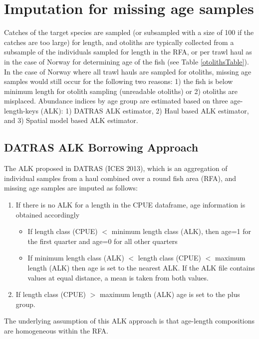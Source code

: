 \documentclass[a4paper 12pt]{article}
\numberwithin{equation}{section}
\begin{document}
{%
\section{\large Imputation for missing age samples}
\label{sec:imputationappendix}
Catches of the target species are sampled (or subsampled with a size of 100 if the catches are too large) for length, and otoliths are typically collected from a subsample of the individuals sampled for length in the RFA,  or per trawl haul as in the case of Norway for determining age of the fish (see Table \ref{otolithsTable}). In the case of Norway where all trawl hauls are sampled for otoliths, missing age samples would still occur for the following two reasons: 1) the fish is below minimum length for otolith sampling (unreadable otoliths) or 2) otoliths are misplaced. Abundance indices by age group are estimated based on three age-length-keys (ALK): 1) DATRAS ALK estimator, 2) Haul based ALK estimator, and 3) Spatial model based ALK estimator.
\subsection{\normalsize DATRAS ALK Borrowing Approach}
\label{secAp:DATRASBorrow}
The ALK proposed in DATRAS (ICES 2013), which is an aggregation of individual samples from a haul combined over a round fish area (RFA), and missing age samples are imputed as follows: 
\begin{enumerate}
\item If there is no ALK for a length in the CPUE dataframe, age information is obtained accordingly
\begin{itemize}
\item If length class (CPUE) $<$ minimum length class (ALK), then age=1 for the first quarter and age=0 for all other quarters
\item  If minimum length class (ALK) $<$ length class (CPUE) $<$ maximum length (ALK) then age is set to the nearest ALK. If the ALK file contains values at equal distance, a mean is taken from both values. 
\end{itemize}
\item If length class (CPUE) $>$ maximum length (ALK) age is set to the plus group.
\end{enumerate}
The underlying assumption of this ALK approach is that age-length compositions are homogeneous within the RFA. 
}
\end{document}

